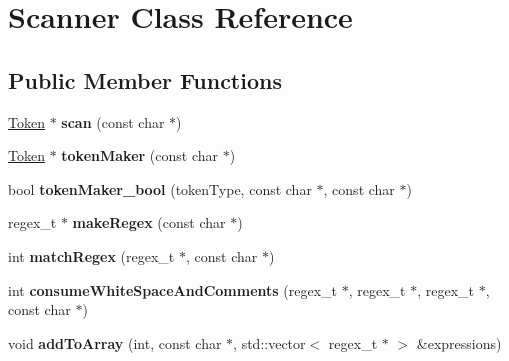 \hypertarget{class_scanner}{}\section{Scanner Class Reference}
\label{class_scanner}
\subsection*{Public Member Functions}
\begin{DoxyCompactItemize}
\item 
\hypertarget{class_scanner_a4cf90c9e68bfb17f23af7368ff15766e}{}\hyperlink{class_token}{Token} $\ast$ {\bfseries scan} (const char $\ast$)\label{class_scanner_a4cf90c9e68bfb17f23af7368ff15766e}

\item 
\hypertarget{class_scanner_a9be26bf95e9661af0852a21fd311693d}{}\hyperlink{class_token}{Token} $\ast$ {\bfseries token\+Maker} (const char $\ast$)\label{class_scanner_a9be26bf95e9661af0852a21fd311693d}

\item 
\hypertarget{class_scanner_a47c391795bd333936f334f3a86b6e53e}{}bool {\bfseries token\+Maker\+\_\+bool} (token\+Type, const char $\ast$, const char $\ast$)\label{class_scanner_a47c391795bd333936f334f3a86b6e53e}

\item 
\hypertarget{class_scanner_ae9fb1d0074f17f291714b86097573058}{}regex\+\_\+t $\ast$ {\bfseries make\+Regex} (const char $\ast$)\label{class_scanner_ae9fb1d0074f17f291714b86097573058}

\item 
\hypertarget{class_scanner_ab873dc8eb3c741bec4634f055954ea97}{}int {\bfseries match\+Regex} (regex\+\_\+t $\ast$, const char $\ast$)\label{class_scanner_ab873dc8eb3c741bec4634f055954ea97}

\item 
\hypertarget{class_scanner_addc73cdb99ea3932ef130b6d17d920d9}{}int {\bfseries consume\+White\+Space\+And\+Comments} (regex\+\_\+t $\ast$, regex\+\_\+t $\ast$, regex\+\_\+t $\ast$, const char $\ast$)\label{class_scanner_addc73cdb99ea3932ef130b6d17d920d9}

\item 
\hypertarget{class_scanner_af660f8b4a17b79a75dd9ad35b5fcdcd3}{}void {\bfseries add\+To\+Array} (int, const char $\ast$, std\+::vector$<$ regex\+\_\+t $\ast$ $>$ \&expressions)\label{class_scanner_af660f8b4a17b79a75dd9ad35b5fcdcd3}

\end{DoxyCompactItemize}
